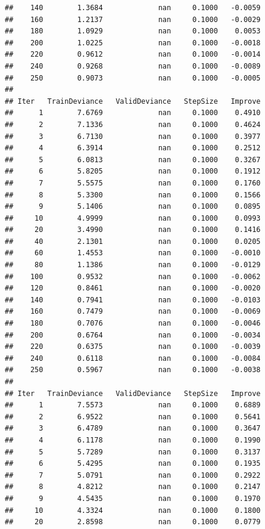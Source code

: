\documentclass[]{book}
\begin{document}
\begin{verbatim}
##    140        1.3684             nan     0.1000   -0.0059
##    160        1.2137             nan     0.1000   -0.0029
##    180        1.0929             nan     0.1000    0.0053
##    200        1.0225             nan     0.1000   -0.0018
##    220        0.9612             nan     0.1000   -0.0014
##    240        0.9268             nan     0.1000   -0.0089
##    250        0.9073             nan     0.1000   -0.0005
## 
## Iter   TrainDeviance   ValidDeviance   StepSize   Improve
##      1        7.6769             nan     0.1000    0.4910
##      2        7.1336             nan     0.1000    0.4624
##      3        6.7130             nan     0.1000    0.3977
##      4        6.3914             nan     0.1000    0.2512
##      5        6.0813             nan     0.1000    0.3267
##      6        5.8205             nan     0.1000    0.1912
##      7        5.5575             nan     0.1000    0.1760
##      8        5.3300             nan     0.1000    0.1566
##      9        5.1406             nan     0.1000    0.0895
##     10        4.9999             nan     0.1000    0.0993
##     20        3.4990             nan     0.1000    0.1416
##     40        2.1301             nan     0.1000    0.0205
##     60        1.4553             nan     0.1000   -0.0010
##     80        1.1386             nan     0.1000   -0.0129
##    100        0.9532             nan     0.1000   -0.0062
##    120        0.8461             nan     0.1000   -0.0020
##    140        0.7941             nan     0.1000   -0.0103
##    160        0.7479             nan     0.1000   -0.0069
##    180        0.7076             nan     0.1000   -0.0046
##    200        0.6764             nan     0.1000   -0.0034
##    220        0.6375             nan     0.1000   -0.0039
##    240        0.6118             nan     0.1000   -0.0084
##    250        0.5967             nan     0.1000   -0.0038
## 
## Iter   TrainDeviance   ValidDeviance   StepSize   Improve
##      1        7.5573             nan     0.1000    0.6889
##      2        6.9522             nan     0.1000    0.5641
##      3        6.4789             nan     0.1000    0.3647
##      4        6.1178             nan     0.1000    0.1990
##      5        5.7289             nan     0.1000    0.3137
##      6        5.4295             nan     0.1000    0.1935
##      7        5.0791             nan     0.1000    0.2922
##      8        4.8212             nan     0.1000    0.2147
##      9        4.5435             nan     0.1000    0.1970
##     10        4.3324             nan     0.1000    0.1800
##     20        2.8598             nan     0.1000    0.0779

\end{verbatim}
\end{document}

